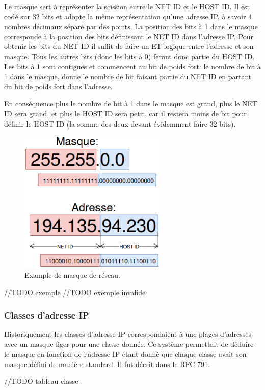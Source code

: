 Le masque sert à représenter la scission entre le NET ID et le HOST ID.
Il est codé sur 32 bits et adopte la même représentation qu'une adresse IP, à savoir
4 nombres décimaux séparé par des points.
La position des bits à 1 dans le masque corresponde à la position des bits définissant le NET ID dans l'adresse IP.
Pour obtenir les bits du NET ID il suffit de faire un ET logique entre l'adresse et son masque. Tous les autres bits (donc les bits à 0)
feront donc partie du HOST ID.
Les bits à 1 sont contiguës et commencent au bit de poids fort: le nombre de bit à 1 dans le masque, donne
le nombre de bit faisant partie du NET ID en partant du bit de poids fort dans l'adresse.

En conséquence plus le nombre de bit à 1 dans le masque est grand, plus le NET ID sera grand, et plus le HOST ID sera petit, car il restera moins de bit pour définir le HOST ID (la somme des deux devant évidemment faire 32 bits).

\begin{figure}
\centering
\includegraphics[width=7cm]{./pics/maskipv4.eps}
\caption{Example de masque de réseau.}
\label{fig:exmask}
\end{figure}

//TODO exemple
//TODO exemple invalide

\subsubsection{Classes d'adresse IP}
Historiquement les classes d'adresse IP correspondaient à une plages d'adresses avec un masque figer pour une classe donnée.
Ce système permettait de déduire le masque en fonction
de l'adresse IP étant donné que chaque classe avait son masque défini de manière standard.
Il fut décrit dans le RFC 791\cite{url-RFC-791}.

//TODO tableau classe

